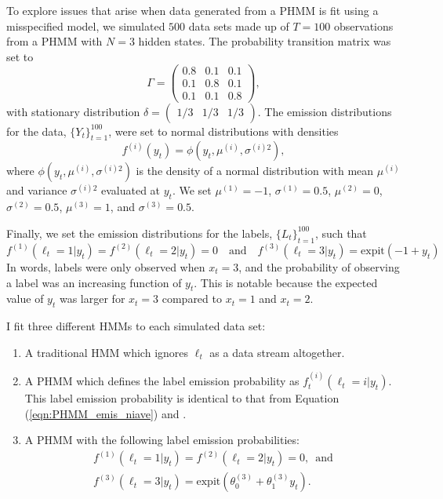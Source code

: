 
To explore issues that arise when data generated from a PHMM is fit using a misspecified model, we simulated $500$ data sets made up of $T = 100$ observations from a PHMM with $N = 3$ hidden states. The probability transition matrix was set to 
%
\begin{equation*}
   \Gamma = \begin{pmatrix} 
                0.8 & 0.1 & 0.1 \\
                0.1 & 0.8 & 0.1 \\
                0.1 & 0.1 & 0.8 
            \end{pmatrix}, 
\end{equation*}
%
with stationary distribution $\delta = \begin{pmatrix} 1/3 & 1/3 & 1/3 \end{pmatrix}$. 
%
The emission distributions for the data, $\{Y_t\}_{t=1}^{100}$, were set to normal distributions with densities
\begin{equation*}
    f^{(i)}(y_t) = \phi(y_t,\mu^{(i)},\sigma^{(i)2}),
\end{equation*}
where $\phi(y_t,\mu^{(i)},\sigma^{(i)2})$ is the density of a normal distribution with mean $\mu^{(i)}$ and variance $\sigma^{(i)2}$ evaluated at $y_t$. We set $\mu^{(1)} = -1$, $\sigma^{(1)} = 0.5$, $\mu^{(2)} = 0$, $\sigma^{(2)}=0.5$, $\mu^{(3)} = 1$, and $\sigma^{(3)} = 0.5$.

Finally, we set the emission distributions for the labels, $\{L_t\}_{t=1}^{100}$, such that
\begin{equation*}
    f^{(1)}(\ell_t = 1|y_t) = f^{(2)}(\ell_t = 2|y_t) = 0 \quad \text{and} \quad f^{(3)}(\ell_t = 3|y_t) = \text{expit}(-1+y_t)
\end{equation*}
In words, labels were only observed when $x_t = 3$, and the probability of observing a label was an increasing function of $y_t$. This is notable because the expected value of $y_t$ was larger for $x_t = 3$ compared to $x_t = 1$ and $x_t = 2$.

I fit three different HMMs to each simulated data set: 
%
\begin{enumerate}
    \item A traditional HMM which ignores $\ell_t$ as a data stream altogether.
    \item A PHMM which defines the label emission probability as $f_t^{(i)}(\ell_t = i|y_t)$. This label emission probability is identical to that from Equation (\ref{eqn:PHMM_emis_niave}) and \cite{McClintock:2018}.
    \item A PHMM with the following label emission probabilities:
    \begin{gather}
        f^{(1)}(\ell_t = 1|y_t) = f^{(2)}(\ell_t = 2|y_t) = 0, \enspace \text{and} \nonumber \\
        f^{(3)}(\ell_t = 3|y_t) = \text{expit}(\theta^{(3)}_0+\theta^{(3)}_1 y_t).
        \label{eqn:PHMM_emis_ss}
    \end{gather}
\end{enumerate}

